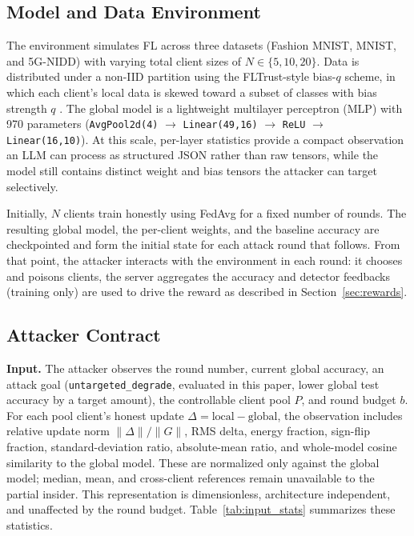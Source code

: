\documentclass[conference,9pt]{IEEEtran}
\begin{document}
\subsection{Model and Data Environment}
The environment simulates FL across three datasets (Fashion MNIST, MNIST, and 5G-NIDD) with varying total client sizes of $N \in \{5, 10, 20\}$. Data is distributed under a non-IID partition using the FLTrust-style bias-$q$ scheme, in which each client's local data is skewed toward a subset of classes with bias strength $q$ \cite{fltrust}. The global model is a lightweight multilayer perceptron (MLP) with 970 parameters (\texttt{AvgPool2d(4)} $\to$ \texttt{Linear(49,16)} $\to$ \texttt{ReLU} $\to$ \texttt{Linear(16,10)}). At this scale, per-layer statistics provide a compact observation an LLM can process as structured JSON rather than raw tensors, while the model still contains distinct weight and bias tensors the attacker can target selectively.

Initially, $N$ clients train honestly using FedAvg for a fixed number of rounds. The resulting global model, the per-client weights, and the baseline accuracy are checkpointed and form the initial state for each attack round that follows. From that point, the attacker interacts with the environment in each round: it chooses and poisons clients, the server aggregates the accuracy and detector feedbacks (training only) are used to drive the reward as described in Section~\ref{sec:rewards}.

\subsection{Attacker Contract}
\label{sec:attacker-contract}
\textbf{Input.} The attacker observes the round number, current global accuracy, an attack goal (\texttt{untargeted\_degrade}, evaluated in this paper, lower global test accuracy by a target amount), the controllable client pool $P$, and round budget $b$. For each pool client's honest update $\Delta = \mathrm{local} - \mathrm{global}$, the observation includes relative update norm $\|\Delta\|/\|G\|$, RMS delta, energy fraction, sign-flip fraction, standard-deviation ratio, absolute-mean ratio, and whole-model cosine similarity to the global model. These are normalized only against the global model; median, mean, and cross-client references remain unavailable to the partial insider. This representation is dimensionless, architecture independent, and unaffected by the round budget. Table~\ref{tab:input_stats} summarizes these statistics.
\end{document}
